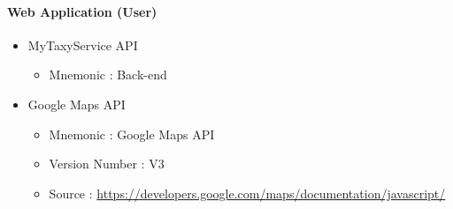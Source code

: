 \documentclass[12pt, a4paper]{article}
\begin{document}
\paragraph{Web Application (User)} 

\begin{itemize}
	\item MyTaxyService API
	\begin{itemize}
		\item Mnemonic : Back-end
	\end{itemize}
	\item Google Maps API
	\begin{itemize}
		\item Mnemonic : Google Maps API
		\item Version Number : V3
		\item Source : \url{https://developers.google.com/maps/documentation/javascript/} 
	\end{itemize}

\end{itemize}
\end{document}
